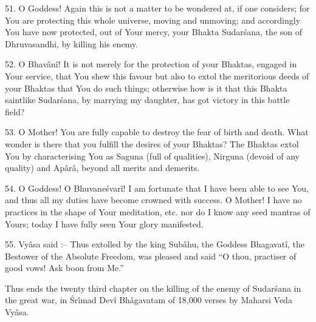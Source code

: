 51. O Goddess! Again this is not a matter to be wondered at, if one considers; for You are protecting this whole universe, moving and unmoving; and accordingly You have now protected, out of Your mercy, your Bhakta Sudar\'sana, the son of Dhruvasandhi, by killing his enemy.

52. O Bhav\^an\^i! It is not merely for the protection of your Bhaktas, engaged in Your service, that You shew this favour but also to extol the meritorious deeds of your Bhaktas that You do such things; otherwise how is it that this Bhakta saintlike Sudar\'sana, by marrying my daughter, has got victory in this battle field?

53. O Mother! You are fully capable to destroy the fear of birth and death. What wonder is there that you fulfill the desires of your Bhaktas? The Bhaktas extol You by characterising You as Saguna (full of qualities), Nirguna (devoid of any quality) and Ap\^ar\^a, beyond all merits and demerits.

54. O Goddess! O Bhuvane\'svar\^i! I am fortunate that I have been able to see You, and thus all my duties have become crowned with success. O Mother! I have no practices in the shape of Your meditation, etc. nor do I know any seed mantras of Yours; today I have fully seen Your glory manifested.

55. Vy\^asa said :-- Thus extolled by the king Sub\^ahu, the Goddess Bhagavat\^i, the Bestower of the Absolute Freedom, was pleased and said ``O thou, practiser of good vows! Ask boon from Me.''

Thus ends the twenty third chapter on the killing of the enemy of Sudar\'sana in the great war, in \'Sr\^imad Dev\^i Bh\^agavatam of 18,000 verses by Maharsi Veda Vy\^asa.